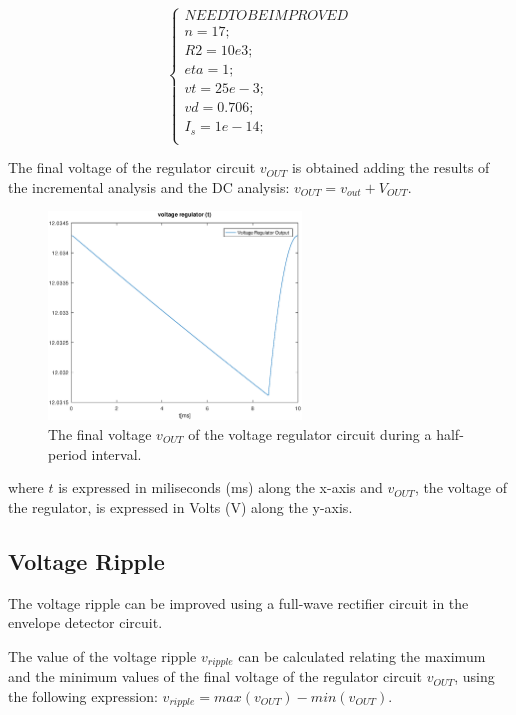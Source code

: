 \[
\left\{\begin{matrix}
NEED TO BE IMPROVED\\
n=17;\\
R2=10e3;\\
eta=1;\\
vt=25e-3;\\
vd=0.706;\\
I_s=1e-14;\\
\end{matrix}\right.
\]

The final voltage of the regulator circuit $v_{OUT}$ is obtained adding the results of the incremental analysis and the DC analysis: $v_{OUT}=v_{out}+V_{OUT}$.

\begin{figure}[H] \centering
\includegraphics[width=0.6\textwidth]{output.eps}
\caption{The final voltage $v_{OUT}$ of the voltage regulator circuit during a half-period interval.}
\label{fig:output}
\end{figure}

where $t$ is expressed in miliseconds (ms) along the x-axis and 
$v_{OUT}$, the voltage of the regulator, is expressed in Volts (V) along the y-axis.

\subsection{Voltage Ripple}
\label{subsec:ripple}

The voltage ripple can be improved using a full-wave rectifier circuit in the envelope detector circuit. 

The value of the voltage ripple $v_{ripple}$ can be calculated relating the maximum and the minimum values of the final voltage of the regulator circuit $v_{OUT}$, using the following expression: $v_{ripple}=max(v_{OUT})-min(v_{OUT})$.


